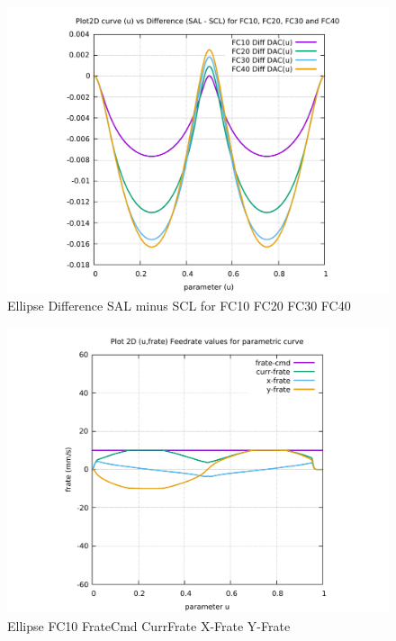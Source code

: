 \begin{figure}
	\caption     {Ellipse Difference SAL minus SCL for FC10 FC20 FC30 FC40}
	\label{26-img-Ellipse-Difference-SAL-minus-SCL-for-FC10-FC20-FC30-FC40.pdf}
	\includegraphics[width=1.00\textwidth]{Chap4/appendix/app-Ellipse/plots/26-img-Ellipse-Difference-SAL-minus-SCL-for-FC10-FC20-FC30-FC40.pdf}
\end{figure}


\clearpage
\pagebreak

\begin{figure}
	\caption     {Ellipse FC10 FrateCmd CurrFrate X-Frate Y-Frate}
	\label{27-img-Ellipse-FC10-FrateCmd-CurrFrate-X-Frate-Y-Frate.pdf}
	\includegraphics[width=1.00\textwidth]{Chap4/appendix/app-Ellipse/plots/27-img-Ellipse-FC10-FrateCmd-CurrFrate-X-Frate-Y-Frate.pdf}
\end{figure}



